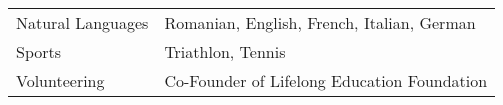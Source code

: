 

\label{sec:further_relevant_information}

\begin{tabular}{p{3cm}l}
	Natural Languages		& Romanian, English, French, Italian, German \\
	Sports			& Triathlon, Tennis \\
	Volunteering	& Co-Founder of Lifelong Education Foundation
\end{tabular}








